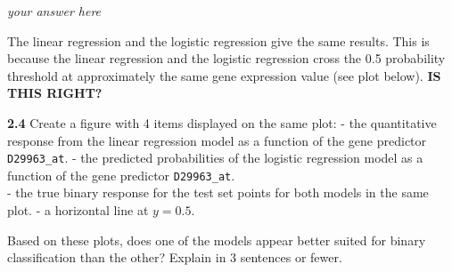 \documentclass[11pt]{article}
\begin{document}
    \emph{your answer here}

The linear regression and the logistic regression give the same results.
This is because the linear regression and the logistic regression cross
the 0.5 probability threshold at approximately the same gene expression
value (see plot below). \textbf{IS THIS RIGHT?}

    \textbf{2.4} Create a figure with 4 items displayed on the same plot: -
the quantitative response from the linear regression model as a function
of the gene predictor \texttt{D29963\_at}. - the predicted probabilities
of the logistic regression model as a function of the gene predictor
\texttt{D29963\_at}.\\
- the true binary response for the test set points for both models in
the same plot. - a horizontal line at \(y=0.5\).

Based on these plots, does one of the models appear better suited for
binary classification than the other? Explain in 3 sentences or fewer.
\end{document}
